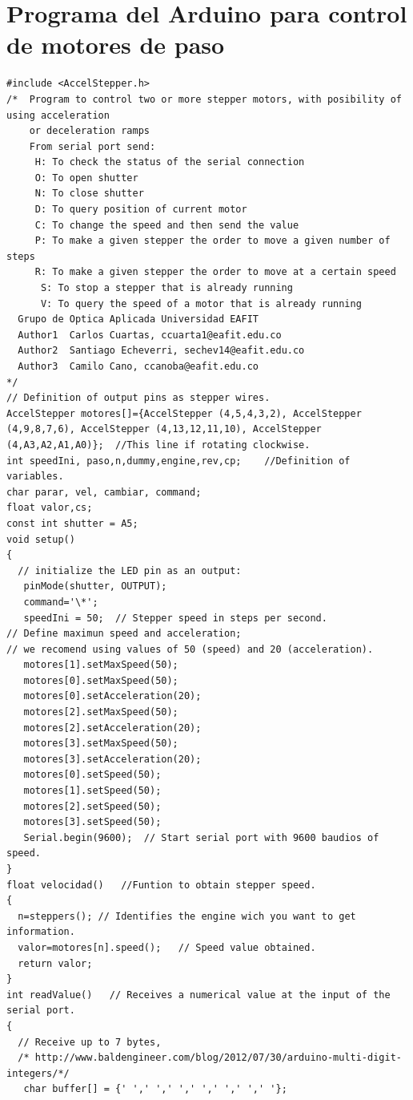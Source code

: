 \section{Programa del Arduino para control de motores de paso}
\begin{lstlisting}[style=Arduino]
#include <AccelStepper.h>
/*  Program to control two or more stepper motors, with posibility of using acceleration 
    or deceleration ramps
    From serial port send:
     H: To check the status of the serial connection
     O: To open shutter
     N: To close shutter
     D: To query position of current motor
     C: To change the speed and then send the value 
     P: To make a given stepper the order to move a given number of steps
     R: To make a given stepper the order to move at a certain speed
      S: To stop a stepper that is already running
      V: To query the speed of a motor that is already running
  Grupo de Optica Aplicada Universidad EAFIT
  Author1  Carlos Cuartas, ccuarta1@eafit.edu.co
  Author2  Santiago Echeverri, sechev14@eafit.edu.co
  Author3  Camilo Cano, ccanoba@eafit.edu.co
*/
// Definition of output pins as stepper wires.
AccelStepper motores[]={AccelStepper (4,5,4,3,2), AccelStepper (4,9,8,7,6), AccelStepper (4,13,12,11,10), AccelStepper (4,A3,A2,A1,A0)};  //This line if rotating clockwise.
int speedIni, paso,n,dummy,engine,rev,cp;    //Definition of variables.
char parar, vel, cambiar, command;
float valor,cs;
const int shutter = A5;
void setup()
{  
  // initialize the LED pin as an output:
   pinMode(shutter, OUTPUT);   
   command='\*'; 
   speedIni = 50;  // Stepper speed in steps per second. 
// Define maximun speed and acceleration;
// we recomend using values of 50 (speed) and 20 (acceleration).
   motores[1].setMaxSpeed(50);   
   motores[0].setMaxSpeed(50);
   motores[0].setAcceleration(20);
   motores[2].setMaxSpeed(50);
   motores[2].setAcceleration(20);
   motores[3].setMaxSpeed(50);
   motores[3].setAcceleration(20);
   motores[0].setSpeed(50);
   motores[1].setSpeed(50);
   motores[2].setSpeed(50);
   motores[3].setSpeed(50);
   Serial.begin(9600);	// Start serial port with 9600 baudios of speed.
}
float velocidad()   //Funtion to obtain stepper speed.
{
  n=steppers(); // Identifies the engine wich you want to get information.
  valor=motores[n].speed();   // Speed value obtained.
  return valor;
}
int readValue()   // Receives a numerical value at the input of the serial port.
{
  // Receive up to 7 bytes,
  /* http://www.baldengineer.com/blog/2012/07/30/arduino-multi-digit-integers/*/
   char buffer[] = {' ',' ',' ',' ',' ',' ',' '}; 

\end{lstlisting}
